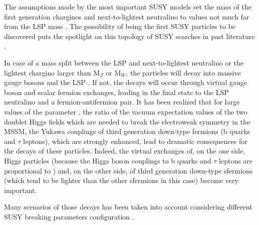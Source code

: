 \FloatBarrier

The assumptions made by the most important SUSY models set the mass of the first generation charginos \charginopm and next-to-lightest neutralino \neutralinotwo to values not much far from the LSP mass \neutralinoone. The possibility of being the first SUSY particles to be discovered puts the spotlight on this topology of SUSY searches in past literature \cite{Abel:2000vs}. 

In case of a mass split between the LSP and next-to-lightest neutralino \neutralinotwo or the lightest chargino \charginopm larger than $\text{M}_{Z}$ or $\text{M}_{W}$, the particles will decay into massive gauge bosons and the LSP \neutralinoone. If not, the decays will occur through virtual gauge boson and scalar fermion exchanges, leading in the final state to the LSP neutralino and a fermion-antifermion pair. It has been realized \cite{Baer:1998bj, Baer:1998sz, Bartl:1999iw, Djouadi:2000aq} that for large values of the parameter \tanbeta, the ratio of the vacuum expectation values of the two doublet Higgs fields which are needed to break the electroweak symmetry in the MSSM, the Yukawa couplings of third generation down-type fermions (b quarks and $\tau$ leptons), which are strongly enhanced, lead to dramatic consequences for the decays of these particles. Indeed, the virtual exchanges of, on the one side, Higgs particles (because the Higgs boson couplings to b quarks and $\tau$ leptons are proportional to \tanbeta) and, on the other side, of third generation down-type sfermions (which tend to be lighter than the other sfermions in this case) become very important.

Many scenarios of those decays has been taken into account considering different SUSY breaking parameters configuration \cite{Djouadi:2001fa}. 

